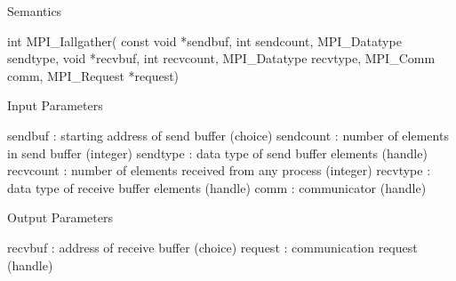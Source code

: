 Semantics

int MPI_Iallgather(
    const void *sendbuf, int sendcount, MPI_Datatype sendtype,
    void *recvbuf, int recvcount, MPI_Datatype recvtype,
    MPI_Comm comm, MPI_Request *request)

Input Parameters

sendbuf : starting address of send buffer (choice)
sendcount : number of elements in send buffer (integer)
sendtype : data type of send buffer elements (handle)
recvcount : number of elements received from any process (integer)
recvtype : data type of receive buffer elements (handle)
comm : communicator (handle)

Output Parameters

recvbuf : address of receive buffer (choice)
request : communication request (handle)
